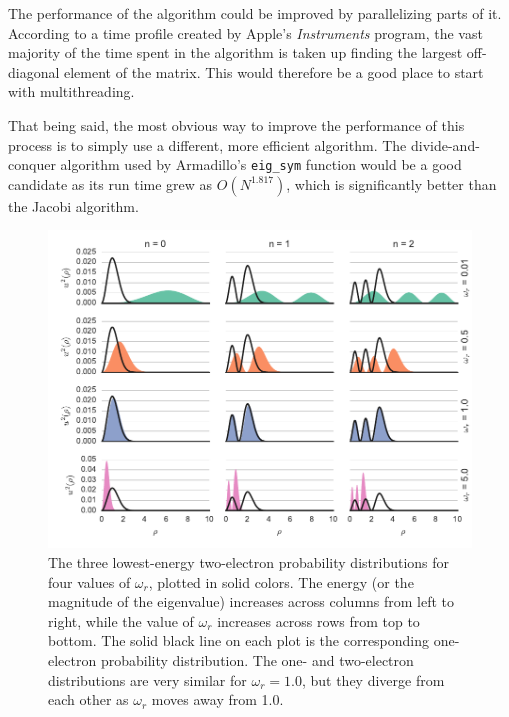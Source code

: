 \documentclass[aps,prc,reprint]{revtex4-1}
\begin{document}
    The performance of the algorithm could be improved by parallelizing parts of it. According to a time profile created by Apple's \emph{Instruments} program, the vast majority of the time spent in the algorithm is taken up finding the largest off-diagonal element of the matrix. This would therefore be a good place to start with multithreading.

    That being said, the most obvious way to improve the performance of this process is to simply use a different, more efficient algorithm. The divide-and-conquer algorithm used by Armadillo's \texttt{eig\_sym} function would be a good candidate as its run time grew as $O(N^{1.817})$, which is significantly better than the Jacobi algorithm.



\begin{figure}
    \includegraphics{wavefunctions.pdf}
    \caption{The three lowest-energy two-electron probability distributions for four values of $\omega_r$, plotted in solid colors. The energy (or the magnitude of the eigenvalue) increases across columns from left to right, while the value of $\omega_r$ increases across rows from top to bottom. The solid black line on each plot is the corresponding one-electron probability distribution. The one- and two-electron distributions are very similar for $\omega_r = 1.0$, but they diverge from each other as $\omega_r$ moves away from 1.0.}
    \label{fig:wavefunctions}
\end{figure}
\end{document}
